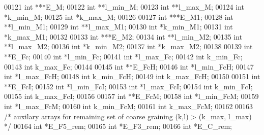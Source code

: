 \begin{DoxyCode}
00121       \textcolor{keywordtype}{int}             ***E\_M;
00122       \textcolor{keywordtype}{int}             **l\_min\_M;
00123       \textcolor{keywordtype}{int}             **l\_max\_M;
00124       \textcolor{keywordtype}{int}             *k\_min\_M;
00125       \textcolor{keywordtype}{int}             *k\_max\_M;
00126 
00127       \textcolor{keywordtype}{int}             ***E\_M1;
00128       \textcolor{keywordtype}{int}             **l\_min\_M1;
00129       \textcolor{keywordtype}{int}             **l\_max\_M1;
00130       \textcolor{keywordtype}{int}             *k\_min\_M1;
00131       \textcolor{keywordtype}{int}             *k\_max\_M1;
00132 
00133       \textcolor{keywordtype}{int}             ***E\_M2;
00134       \textcolor{keywordtype}{int}             **l\_min\_M2;
00135       \textcolor{keywordtype}{int}             **l\_max\_M2;
00136       \textcolor{keywordtype}{int}             *k\_min\_M2;
00137       \textcolor{keywordtype}{int}             *k\_max\_M2;
00138 
00139       \textcolor{keywordtype}{int}             **E\_Fc;
00140       \textcolor{keywordtype}{int}             *l\_min\_Fc;
00141       \textcolor{keywordtype}{int}             *l\_max\_Fc;
00142       \textcolor{keywordtype}{int}             k\_min\_Fc;
00143       \textcolor{keywordtype}{int}             k\_max\_Fc;
00144 
00145       \textcolor{keywordtype}{int}             **E\_FcH;
00146       \textcolor{keywordtype}{int}             *l\_min\_FcH;
00147       \textcolor{keywordtype}{int}             *l\_max\_FcH;
00148       \textcolor{keywordtype}{int}             k\_min\_FcH;
00149       \textcolor{keywordtype}{int}             k\_max\_FcH;
00150 
00151       \textcolor{keywordtype}{int}             **E\_FcI;
00152       \textcolor{keywordtype}{int}             *l\_min\_FcI;
00153       \textcolor{keywordtype}{int}             *l\_max\_FcI;
00154       \textcolor{keywordtype}{int}             k\_min\_FcI;
00155       \textcolor{keywordtype}{int}             k\_max\_FcI;
00156 
00157       \textcolor{keywordtype}{int}             **E\_FcM;
00158       \textcolor{keywordtype}{int}             *l\_min\_FcM;
00159       \textcolor{keywordtype}{int}             *l\_max\_FcM;
00160       \textcolor{keywordtype}{int}             k\_min\_FcM;
00161       \textcolor{keywordtype}{int}             k\_max\_FcM;
00162 
00163       \textcolor{comment}{/* auxilary arrays for remaining set of coarse graining (k,l) > (k\_max, l\_max) */}
00164       \textcolor{keywordtype}{int}             *E\_F5\_rem;
00165       \textcolor{keywordtype}{int}             *E\_F3\_rem;
00166       \textcolor{keywordtype}{int}             *E\_C\_rem;

\end{DoxyCode}

